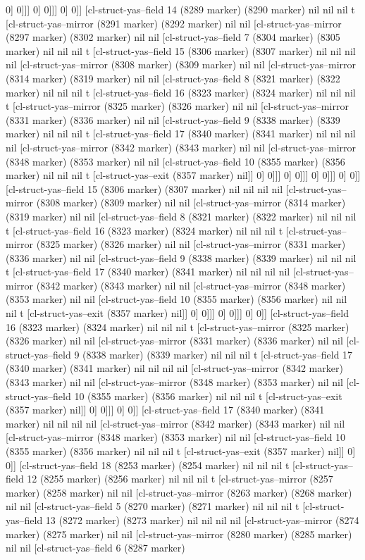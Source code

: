 {{0] 0]]] 0] 0]]] 0] 0]] [cl-struct-yas--field 14 (8289 marker) (8290 marker) nil nil nil t [cl-struct-yas--mirror (8291 marker) (8292 marker) nil nil [cl-struct-yas--mirror (8297 marker) (8302 marker) nil nil [cl-struct-yas--field 7 (8304 marker) (8305 marker) nil nil nil t [cl-struct-yas--field 15 (8306 marker) (8307 marker) nil nil nil nil [cl-struct-yas--mirror (8308 marker) (8309 marker) nil nil [cl-struct-yas--mirror (8314 marker) (8319 marker) nil nil [cl-struct-yas--field 8 (8321 marker) (8322 marker) nil nil nil t [cl-struct-yas--field 16 (8323 marker) (8324 marker) nil nil nil t [cl-struct-yas--mirror (8325 marker) (8326 marker) nil nil [cl-struct-yas--mirror (8331 marker) (8336 marker) nil nil [cl-struct-yas--field 9 (8338 marker) (8339 marker) nil nil nil t [cl-struct-yas--field 17 (8340 marker) (8341 marker) nil nil nil nil [cl-struct-yas--mirror (8342 marker) (8343 marker) nil nil [cl-struct-yas--mirror (8348 marker) (8353 marker) nil nil [cl-struct-yas--field 10 (8355 marker) (8356 marker) nil nil nil t [cl-struct-yas--exit (8357 marker) nil]] 0] 0]]] 0] 0]]] 0] 0]]] 0] 0]] [cl-struct-yas--field 15 (8306 marker) (8307 marker) nil nil nil nil [cl-struct-yas--mirror (8308 marker) (8309 marker) nil nil [cl-struct-yas--mirror (8314 marker) (8319 marker) nil nil [cl-struct-yas--field 8 (8321 marker) (8322 marker) nil nil nil t [cl-struct-yas--field 16 (8323 marker) (8324 marker) nil nil nil t [cl-struct-yas--mirror (8325 marker) (8326 marker) nil nil [cl-struct-yas--mirror (8331 marker) (8336 marker) nil nil [cl-struct-yas--field 9 (8338 marker) (8339 marker) nil nil nil t [cl-struct-yas--field 17 (8340 marker) (8341 marker) nil nil nil nil [cl-struct-yas--mirror (8342 marker) (8343 marker) nil nil [cl-struct-yas--mirror (8348 marker) (8353 marker) nil nil [cl-struct-yas--field 10 (8355 marker) (8356 marker) nil nil nil t [cl-struct-yas--exit (8357 marker) nil]] 0] 0]]] 0] 0]]] 0] 0]] [cl-struct-yas--field 16 (8323 marker) (8324 marker) nil nil nil t [cl-struct-yas--mirror (8325 marker) (8326 marker) nil nil [cl-struct-yas--mirror (8331 marker) (8336 marker) nil nil [cl-struct-yas--field 9 (8338 marker) (8339 marker) nil nil nil t [cl-struct-yas--field 17 (8340 marker) (8341 marker) nil nil nil nil [cl-struct-yas--mirror (8342 marker) (8343 marker) nil nil [cl-struct-yas--mirror (8348 marker) (8353 marker) nil nil [cl-struct-yas--field 10 (8355 marker) (8356 marker) nil nil nil t [cl-struct-yas--exit (8357 marker) nil]] 0] 0]]] 0] 0]] [cl-struct-yas--field 17 (8340 marker) (8341 marker) nil nil nil nil [cl-struct-yas--mirror (8342 marker) (8343 marker) nil nil [cl-struct-yas--mirror (8348 marker) (8353 marker) nil nil [cl-struct-yas--field 10 (8355 marker) (8356 marker) nil nil nil t [cl-struct-yas--exit (8357 marker) nil]] 0] 0]] [cl-struct-yas--field 18 (8253 marker) (8254 marker) nil nil nil t [cl-struct-yas--field 12 (8255 marker) (8256 marker) nil nil nil t [cl-struct-yas--mirror (8257 marker) (8258 marker) nil nil [cl-struct-yas--mirror (8263 marker) (8268 marker) nil nil [cl-struct-yas--field 5 (8270 marker) (8271 marker) nil nil nil t [cl-struct-yas--field 13 (8272 marker) (8273 marker) nil nil nil nil [cl-struct-yas--mirror (8274 marker) (8275 marker) nil nil [cl-struct-yas--mirror (8280 marker) (8285 marker) nil nil [cl-struct-yas--field 6 (8287 marker) }}
